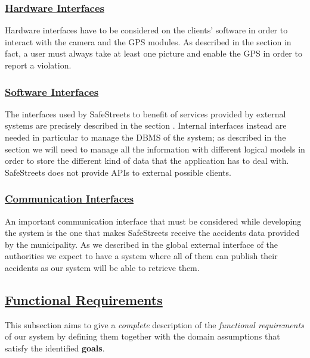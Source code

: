 	\FloatBarrier
	
	\subsubsection[Hardware Interfaces]{\hyperlink{toc}{Hardware Interfaces}}
		Hardware interfaces have to be considered on the clients' software in order to interact with the camera and the GPS modules. As described in the section  in fact, a user must always take at least one picture and enable the GPS in order to report a violation. 
		
	\subsubsection[Software Interfaces]{\hyperlink{toc}{Software Interfaces}}
		The interfaces used by SafeStreets to benefit of services provided by external systems are precisely described in the section . Internal interfaces instead are needed in particular to manage the DBMS of the system; as described in the section  we will need to manage all the information with different logical models in order to store the different kind of data that the application has to deal with. SafeStreets does not provide APIs to external possible clients.
		
	\subsubsection[Communication Interfaces]{\hyperlink{toc}{Communication Interfaces}}
		An important communication interface that must be considered while developing the system is the one that makes SafeStreets receive the accidents data provided by the municipality. As we described in the global external interface of the authorities we expect to have a system where all of them can publish their accidents as our system will be able to retrieve them.

\subsection[Functional Requirements]{\hyperlink{toc}{Functional Requirements}}
	\label{sec:functionalRequirements}
	This subsection aims to give a \emph{complete} description of the \emph{functional requirements} of our system by defining them together with the domain assumptions that satisfy the identified \textbf{goals}.
	
